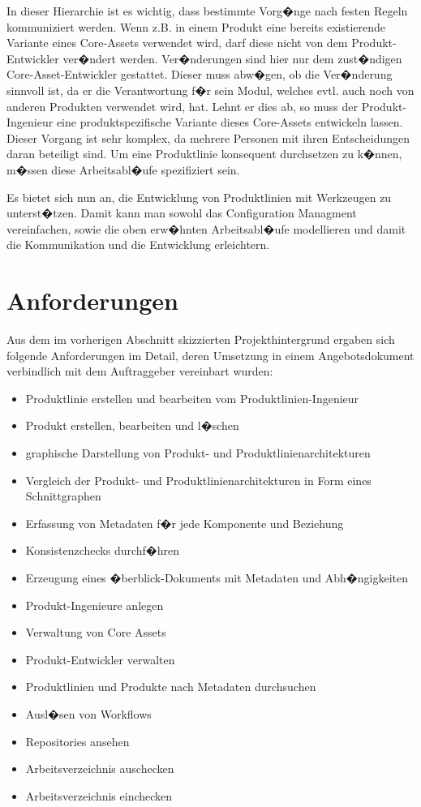 \documentclass[a4paper,titlepage,12pt,ngerman]{scrbook}
\begin{document}
In dieser Hierarchie ist es wichtig, dass bestimmte Vorg�nge nach
festen Regeln kommuniziert werden. Wenn z.B. in einem Produkt eine
bereits existierende Variante eines Core-Assets verwendet wird, darf
diese nicht von dem Produkt-Entwickler ver�ndert werden. Ver�nderungen
sind hier nur dem zust�ndigen Core-Asset-Entwickler gestattet. Dieser
muss abw�gen, ob die Ver�nderung sinnvoll ist, da er die
Verantwortung f�r sein Modul, welches evtl. auch noch von anderen
Produkten verwendet wird, hat. Lehnt er dies ab, so muss der
Produkt-Ingenieur eine produktspezifische Variante dieses Core-Assets
entwickeln lassen. Dieser Vorgang ist sehr komplex, da mehrere Personen
mit ihren Entscheidungen daran beteiligt sind. Um eine Produktlinie
konsequent durchsetzen zu k�nnen, m�ssen diese Arbeitsabl�ufe
spezifiziert sein.\par

Es bietet sich nun an, die Entwicklung von Produktlinien mit Werkzeugen zu
unterst�tzen. Damit kann man sowohl das Configuration Managment
vereinfachen, sowie die oben erw�hnten Arbeitsabl�ufe modellieren und damit
die Kommunikation und die Entwicklung erleichtern.

\section{Anforderungen}

Aus dem im vorherigen Abschnitt skizzierten Projekthintergrund ergaben
sich folgende Anforderungen im Detail, deren Umsetzung in einem
Angebotsdokument verbindlich mit dem Auftraggeber vereinbart wurden:

\begin{itemize}
	\item Produktlinie erstellen und bearbeiten vom Produktlinien-Ingenieur
	\item Produkt erstellen, bearbeiten und l�schen
	\item graphische Darstellung von Produkt- und Produktlinienarchitekturen
	\item Vergleich der Produkt- und Produktlinienarchitekturen in Form eines Schnittgraphen
	\item Erfassung von Metadaten f�r jede Komponente und Beziehung
	\item Konsistenzchecks durchf�hren
	\item Erzeugung eines �berblick-Dokuments mit Metadaten und Abh�ngigkeiten
	\item Produkt-Ingenieure anlegen
	\item Verwaltung von Core Assets
	\item Produkt-Entwickler verwalten
	\item Produktlinien und Produkte nach Metadaten durchsuchen
	\item Ausl�sen von Workflows
	\item Repositories ansehen
	\item Arbeitsverzeichnis auschecken
	\item Arbeitsverzeichnis einchecken
\end{itemize}
\end{document}
